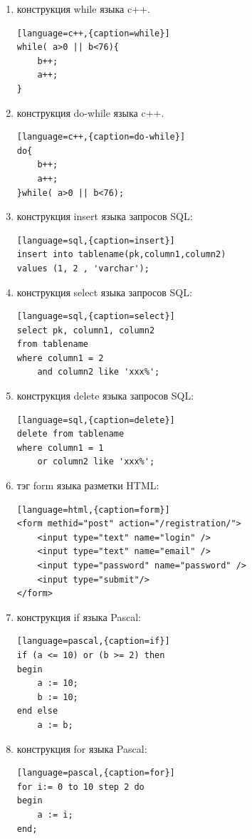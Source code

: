 \documentclass[a4paper,12pt]{article}
\begin{document}
\begin{enumerate}
\item конструкция while языка c++. 
\begin{lstlisting}[language=c++,{caption=while}]
while( a>0 || b<76){
	b++;
	a++;
}
\end{lstlisting}

\item конструкция do-while языка c++. 
\begin{lstlisting}[language=c++,{caption=do-while}]
do{
	b++;
	a++;
}while( a>0 || b<76);
\end{lstlisting}

	\item конструкция insert языка запросов SQL:
\begin{lstlisting}[language=sql,{caption=insert}]
insert into tablename(pk,column1,column2) 
values (1, 2 , 'varchar');
\end{lstlisting}

	\item конструкция select языка запросов SQL:
\begin{lstlisting}[language=sql,{caption=select}]
select pk, column1, column2
from tablename
where column1 = 2 
	and column2 like 'xxx%';
\end{lstlisting}

	\item конструкция delete языка запросов SQL:
\begin{lstlisting}[language=sql,{caption=delete}]
delete from tablename
where column1 = 1
	or column2 like 'xxx%';
\end{lstlisting}

	\item тэг form языка разметки HTML: 
\begin{lstlisting}[language=html,{caption=form}]
<form methid="post" action="/registration/">
	<input type="text" name="login" />
	<input type="text" name="email" />
	<input type="password" name="password" />
	<input type="submit"/>
</form>
\end{lstlisting}

	\item конструкция if языка Pascal: 
\begin{lstlisting}[language=pascal,{caption=if}]
if (a <= 10) or (b >= 2) then
begin
	a := 10;
	b := 10;
end else
	a := b;

\end{lstlisting}

	\item конструкция for языка Pascal: 
\begin{lstlisting}[language=pascal,{caption=for}]
for i:= 0 to 10 step 2 do 
begin
	a := i;
end;
\end{lstlisting}

\end{enumerate}
\end{document}
